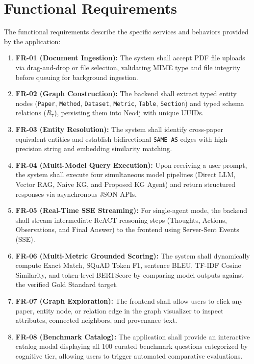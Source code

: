\documentclass[12pt,a4paper,oneside]{report}
\begin{document}
\section{Functional Requirements}
The functional requirements describe the specific services and behaviors provided by the application:
\begin{enumerate}
    \item \textbf{FR-01 (Document Ingestion):} The system shall accept PDF file uploads via drag-and-drop or file selection, validating MIME type and file integrity before queuing for background ingestion.
    \item \textbf{FR-02 (Graph Construction):} The backend shall extract typed entity nodes (\texttt{Paper}, \texttt{Method}, \texttt{Dataset}, \texttt{Metric}, \texttt{Table}, \texttt{Section}) and typed schema relations ($R_7$), persisting them into Neo4j with unique UUIDs.
    \item \textbf{FR-03 (Entity Resolution):} The system shall identify cross-paper equivalent entities and establish bidirectional \texttt{SAME\_AS} edges with high-precision string and embedding similarity matching.
    \item \textbf{FR-04 (Multi-Model Query Execution):} Upon receiving a user prompt, the system shall execute four simultaneous model pipelines (Direct LLM, Vector RAG, Naive KG, and Proposed KG Agent) and return structured responses via asynchronous JSON APIs.
    \item \textbf{FR-05 (Real-Time SSE Streaming):} For single-agent mode, the backend shall stream intermediate ReACT reasoning steps (Thoughts, Actions, Observations, and Final Answer) to the frontend using Server-Sent Events (SSE).
    \item \textbf{FR-06 (Multi-Metric Grounded Scoring):} The system shall dynamically compute Exact Match, SQuAD Token F1, sentence BLEU, TF-IDF Cosine Similarity, and token-level BERTScore by comparing model outputs against the verified Gold Standard target.
    \item \textbf{FR-07 (Graph Exploration):} The frontend shall allow users to click any paper, entity node, or relation edge in the graph visualizer to inspect attributes, connected neighbors, and provenance text.
    \item \textbf{FR-08 (Benchmark Catalog):} The application shall provide an interactive catalog modal displaying all 100 curated benchmark questions categorized by cognitive tier, allowing users to trigger automated comparative evaluations.
\end{enumerate}
\end{document}
